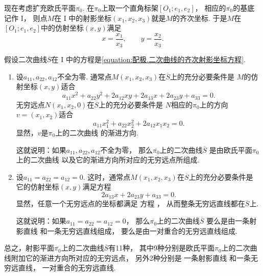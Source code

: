 现在考虑扩充欧氏平面\(\overline{\pi_0}\).
在\(\pi_0\)上取一个直角标架\([O_1;e_1,e_2]\)，
相应的\(\overline{\pi_0}\)的基底记作 I，
则点\(M\)在 I 中的射影坐标\((x_1,x_2,x_3)\)就是\(M\)的齐次坐标.
于是\(M\)在\([O_1;e_1,e_2]\)中的仿射坐标\((x,y)\)满足\begin{equation*}
	x = \frac{x_1}{x_3},
	\qquad
	y = \frac{x_2}{x_3}.
\end{equation*}

假设二次曲线\(\overline{S}\)在 I 中的方程是\cref{equation:配极.二次曲线的齐次射影坐标方程}.
\begingroup
{}
\begin{enumerate}[label={{\rm\bf 情形}\arabic*.}]
	\item 设\(a_{11},a_{22},a_{12}\)不全为零.
	通常点\(M(x_1,x_2,x_3)\)在\(\overline{S}\)上的充分必要条件是
	\(M\)的仿射坐标\((x,y)\)适合\begin{equation}\label{equation:配极.二次曲线的非齐次仿射坐标方程1}
		a_{11} x^2
		+ a_{22} y^2
		+ 2 a_{12} x y
		+ 2 a_{13} x
		+ 2 a_{23} y
		+ a_{33}
		= 0.
	\end{equation}
	无穷远点\(N(x_1,x_2,0)\)在\(\overline{S}\)上的充分必要条件是
	\(N\)相应的\(\pi_0\)上的方向\(v = (x_1,x_2)\)适合\begin{equation}
		a_{11} x_1^2
		+ a_{22} x_2^2
		+ 2 a_{12} x_1 x_2
		= 0.
	\end{equation}
	显然，\(v\)是\(\pi_0\)上的二次曲线  的渐进方向.

	这就说明：如果\(a_{11},a_{22},a_{12}\)不全为零，
	那么\(\overline{\pi_0}\)上的二次曲线\(\overline{S}\)
	是由欧氏平面\(\pi_0\)上的二次曲线 
	以及它的渐进方向所对应的无穷远点所组成.

	\item 设\(a_{11} = a_{22} = a_{12} = 0\).
	这时，通常点\(M(x_1,x_2,x_3)\)在\(\overline{S}\)上的充分必要条件是
	它的仿射坐标\((x,y)\)满足方程\begin{equation}\label{equation:配极.二次曲线的非齐次仿射坐标方程2}
		2 a_{13} x
		+ 2 a_{23} y
		+ a_{33} = 0.
	\end{equation}
	显然，任意一个无穷远点的坐标都满足
	方程 ，
	从而整条无穷远直线都在\(\overline{S}\)上.

	这就说明：如果\(a_{11} = a_{22} = a_{12} = 0\)，
	那么\(\overline{\pi_0}\)上的二次曲线\(\overline{S}\)
	要么是由一条射影直线 
	和一条无穷远直线组成，
	要么是由一对重合的无穷远直线组成.
\end{enumerate}
\endgroup

总之，射影平面\(\overline{\pi_0}\)上的二次曲线\(\overline{S}\)有11种，
其中9种分别是欧氏平面\(\pi_0\)上的二次曲线附加它的渐进方向所对应的无穷远点，
另外2种分别是
一条射影直线  和一条无穷远直线，
一对重合的无穷远直线.
